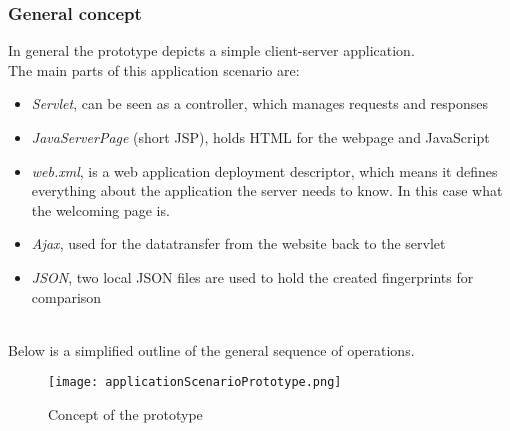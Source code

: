 \subsubsection{General concept}
In general the prototype depicts a simple client-server application. \\
The main parts of this application scenario are:\\
\begin{itemize}
	\item \textit{Servlet}, can be seen as a controller, which manages requests and responses
	\item \textit{JavaServerPage }(short JSP), holds HTML for the webpage and JavaScript
	\item \textit{web.xml}, is a web application deployment descriptor, which means it defines everything about the application the server needs to know. In this case what the welcoming page is.
	\item \textit{Ajax}, used for the datatransfer from the website back to the servlet
	\item \textit{JSON}, two local JSON files are used to hold the created fingerprints for comparison\\\\
\end{itemize} 

Below is a simplified outline of the general sequence of operations.

\begin{figure}[H]
	\centering
	\texttt{[image: applicationScenarioPrototype.png]}
	\caption{Concept of the prototype\\}
	\label{fig:ConceptPrototype}
\end{figure}


